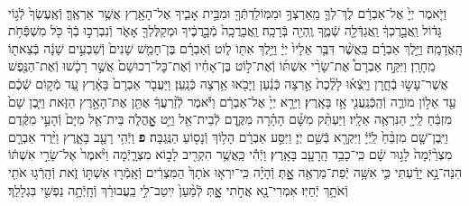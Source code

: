 \documentclass[twoside, openany, parskip=half, 11pt]{book}
\begin{document}
\begin{footnotesize}
\begin{multicols}{2}
\\
וַיֹּ֤אמֶר יְיָ֙ אֶל־אַבְרָ֔ם לֶךְ־לְךָ֛ מֵֽאַרְצְךָ֥ וּמִמּֽוֹלַדְתְּֿךָ֖ וּמִבֵּ֣ית אָבִ֑יךָ אֶל־הָאָ֖רֶץ אֲשֶׁ֥ר אַרְאֶֽךָּ׃ וְֿאֶֽעֶשְׂךָ֙ לְֿג֣וֹי גָּד֔וֹל וַֽאֲבָ֣רֶכְךָ֔ וַֽאֲגַדְּֿלָ֖ה שְֿׁמֶ֑ךָ וֶֽהְיֵ֖ה בְּֿרָכָֽה׃ וַֽאֲבָרֲכָֽה֙ מְֿבָ֣רֲכֶ֔יךָ וּמְקַלֶּלְךָ֖ אָאֹ֑ר וְֿנִבְרְכ֣וּ בְֿךָ֔ כֹּ֖ל מִשְׁפְּֿחֹ֥ת הָֽאֲדָמָֽה׃  וַיֵּ֣לֶךְ אַבְרָ֗ם כַּֽאֲשֶׁ֨ר דִּבֶּ֤ר אֵלָיו֙ יְיָ֔ וַיֵּ֥לֶךְ אִתּ֖וֹ ל֑וֹט וְֿאַבְרָ֗ם בֶּן־חָמֵ֤שׁ שָׁנִים֙ וְֿשִׁבְעִ֣ים שָׁנָ֔ה בְּֿצֵאת֖וֹ מֵֽחָרָֽן׃ וַיִּקַּ֣ח אַבְרָם֩ אֶת־שָׂרַ֨י אִשְׁתּ֜וֹ וְֿאֶת־ל֣וֹט בֶּן־אָחִ֗יו וְֿאֶת־כׇּל־רְכוּשָׁם֙ אֲשֶׁ֣ר רָכָ֔שׁוּ וְֿאֶת־הַנֶּ֖פֶשׁ אֲשֶׁר־עָשׂ֣וּ בְֿחָ֑רָן וַיֵּֽצְֿא֗וּ לָלֶ֨כֶת֙ אַ֣רְצָה כְּֿנַ֔עַן וַיָּבֹ֖אוּ אַ֥רְצָה כְּֿנָֽעַן׃ וַיַּעֲבֹ֤ר אַבְרָם֙ בָּאָ֔רֶץ עַ֚ד מְֿק֣וֹם שְֿׁכֶ֔ם עַ֖ד אֵל֣וֹן מוֹרֶ֑ה וְֿהַֽכְּֿנַֽעֲנִ֖י אָ֥ז בָּאָֽרֶץ׃ וַיֵּרָ֤א יְיָ֙ אֶל־אַבְרָ֔ם וַיֹּ֕אמֶר לְֿזַ֨רְעֲךָ֔ אֶתֵּ֖ן אֶת־הָאָ֣רֶץ הַזֹּ֑את וַיִּ֤בֶן שָׁם֙ מִזְבֵּ֔חַ לַֽייָ֖ הַנִּרְאֶ֥ה אֵלָֽיו׃ וַיַּעְתֵּ֨ק מִשָּׁ֜ם הָהָ֗רָה מִקֶּ֛דֶם לְֿבֵית־אֵ֖ל וַיֵּ֣ט אׇׇׇׇׇׇָֽהֳלֹ֑ה בֵּית־אֵ֤ל מִיָּם֙ וְֿהָעַ֣י מִקֶּ֔דֶם וַיִּֽבֶן־שָׁ֤ם מִזְבֵּ֨חַ֙ לַֽיְֿיָ֔ וַיִּקְרָ֖א בְּֿשֵׁ֥ם יְיָ׃ וַיִּסַּ֣ע אַבְרָ֔ם הָל֥וֹךְ וְֿנָס֖וֹעַ הַנֶּֽגְבָּה׃ \textbf{פ}
 וַיְֿהִ֥י רָעָ֖ב בָּאָ֑רֶץ וַיֵּ֨רֶד אַבְרָ֤ם מִצְרַ֨יְֿמָה֙ לָג֣וּר שָׁ֔ם כִּֽי־כָבֵ֥ד הָֽרָעָ֖ב בָּאָֽרֶץ׃ וַיְֿהִ֕י כַּֽאֲשֶׁ֥ר הִקְרִ֖יב לָב֣וֹא מִצְרָ֑יְֿמָה וַיֹּ֨אמֶר֙ אֶל־שָׂרַ֣י אִשְׁתּ֔וֹ הִנֵּה־נָ֣א יָדַ֔עְתִּי כִּ֛י אִשָּׁ֥ה יְֿפַת־מַרְאֶ֖ה אׇׇׇָֽתְּ׃ וְֿהָיָ֗ה כִּֽי־יִרְא֤וּ אֹתָךְ֙ הַמִּצְרִ֔ים וְֿאָֽמְֿר֖וּ אִשְׁתּ֣וֹ זֹ֑את וְֿהָֽרְֿג֥וּ אֹתִ֖י וְֿאֹתָ֥ךְ יְֿחַיּֽוּ׃ אִמְרִי־נָ֖א אֲחֹ֣תִי אׇׇָ֑תְּ לְֿמַ֨עַן֙ יִֽיטַב־לִ֣י בַֽעֲבוּרֵ֔ךְ וְֿחָֽיְֿתָ֥ה נַפְשִׁ֖י בִּגְלָלֵֽךְ׃


\end{multicols}
\end{footnotesize}
\end{document}
